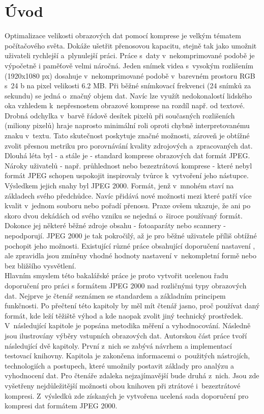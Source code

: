 \chapter{Úvod}

Optimalizace velikosti obrazových dat pomocí komprese je velkým tématem počítačového světa. Dokáže ušetřit přenosovou kapacitu, stejně tak jako umožnit uživateli rychlejší a~plynulejší práci. Práce s~daty v~nekomprimované podobě je výpočetně i paměťově velmi náročná. Jeden snímek videa s~vysokým rozlišením (1920x1080 px) dosahuje v~nekomprimované podobě v~barevném prostoru RGB s~24 b na pixel velikosti 6.2 MB. Při běžné snímkovací frekvenci (24 snímků za sekundu) se jedná o~značný objem dat. Navíc lze využít nedokonalostí lidského oka vzhledem k~nepřesnostem obrazové komprese na rozdíl např. od textové. Drobná odchylka v~barvě řádově desítek pixelů při současných rozlišeních (miliony pixelů) hraje naprosto minimální roli oproti chybně interpretovanému znaku v~textu. Tato skutečnost poskytuje značné možnosti, zároveň je obtížné zvolit přesnou metriku pro porovnávání kvality zdrojových a~zpracovaných dat.\\
Dlouhá léta byl - a stále je - standard komprese obrazových dat formát JPEG. Nároky uživatelů - např. průhlednost nebo bezeztrátová komprese - které nebyl formát JPEG schopen uspokojit inspirovaly tvůrce k~vytvoření jeho nástupce. 
Výsledkem jejich snahy byl JPEG 2000. Formát, jenž v~mnohém staví na základech svého předchůdce. Navíc přidává nové možnosti mezi které patří více kvalit v~jednom souboru nebo pořadí přenosu. Praxe ovšem ukazuje, že ani po skoro dvou dekádách od svého vzniku se nejedná o~široce používaný formát. Dokonce jej některé běžné zdroje obsahu - fotoaparáty nebo scannery - nepodporují. JPEG 2000 je tak pokročilý, až je pro běžné uživatele příliš obtížné pochopit jeho možnosti. Existující různé práce obsahující doporučení nastavení \cite{profile} \cite{ndk} \cite{bl}, ale zpravidla jsou zmíněny vhodné hodnoty nastavení v~nekompletní formě nebo bez bližšího vysvětlení. \\
Hlavním smyslem této bakalářské práce je proto vytvořit ucelenou řadu doporučení pro práci s formátem JPEG 2000 nad rozličnými typy obrazových dat. Nejprve je čtenář seznámen se standardem a základním principem funkčnosti. 
Po přečtení této kapitoly by měl mít čtenář jasno, proč používat daný formát, kde leží těžiště výhod a kde naopak zvolit jiný technický prostředek. V~následující kapitole je popsána metodika měření a vyhodnocování. Následně jsou ilustrovány výběry vstupních obrazových dat. Autorskou část práce tvoří následující dvě kapitoly. První z~nich se zabývá návrhem a implementací testovací knihovny. Kapitola je zakončena informacemi o~použitých nástrojích, technologiích a postupech, které umožnily postavit základy pro analýzu a vyhodnocení dat. Pro čtenáře zdaleka nejzajímavější bude druhá z~nich. Jsou zde vyšetřeny nejdůležitější možnosti obou knihoven při ztrátové i~bezeztrátové kompresi. Z~výsledků zde získaných je vytvořena ucelená sada doporučení pro kompresi dat formátem JPEG 2000. 

